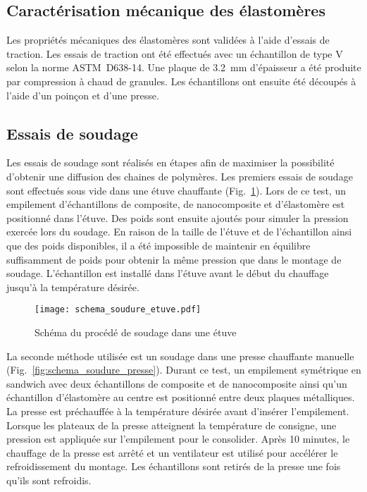 \subsection{Caractérisation mécanique des élastomères}

Les propriétés mécaniques des élastomères sont validées à l'aide d'essais de traction. 
Les essais de traction ont été effectués avec un échantillon de type V selon la norme ASTM~D638-14. 
Une plaque de \SI[locale=FR]{3.2}{\milli\metre} d'épaisseur a été produite par compression à chaud de granules. 
Les échantillons ont ensuite été découpés à l'aide d'un poinçon et d'une presse. 

\subsection{Essais de soudage}

Les essais de soudage sont réalisés en étapes afin de maximiser la possibilité d'obtenir une diffusion des chaines de polymères. 
Les premiers essais de soudage sont effectués sous vide dans une étuve chauffante (Fig.~\ref{fig:schema_soudure_etuve}). 
Lors de ce test, un empilement d'échantillons de composite, de nanocomposite et d'élastomère est positionné dans l'étuve. 
Des poids sont ensuite ajoutés pour simuler la pression exercée lors du soudage. 
En raison de la taille de l'étuve et de l'échantillon ainsi que des poids disponibles, il a été impossible de maintenir en équilibre suffisamment de poids pour obtenir la même pression que dans le montage de soudage. 
L'échantillon est installé dans l'étuve avant le début du chauffage jusqu'à la température désirée. 

\begin{figure}[h]
	\centering
	\texttt{[image: schema\_soudure\_etuve.pdf]}
	\caption{Schéma du procédé de soudage dans une étuve}
	\label{fig:schema_soudure_etuve}
\end{figure}

La seconde méthode utilisée est un soudage dans une presse chauffante manuelle (Fig.~\ref{fig:schema_soudure_presse}). 
Durant ce test, un empilement symétrique en sandwich avec deux échantillons de composite et de nanocomposite ainsi qu'un échantillon d'élastomère au centre est positionné entre deux plaques métalliques. 
La presse est préchauffée à la température désirée avant d'insérer l'empilement. 
Lorsque les plateaux de la presse atteignent la température de consigne, une pression est appliquée sur l'empilement pour le consolider. 
Après 10 minutes, le chauffage de la presse est arrêté et un ventilateur est utilisé pour accélérer le refroidissement du montage. 
Les échantillons sont retirés de la presse une fois qu'ils sont refroidis. 

